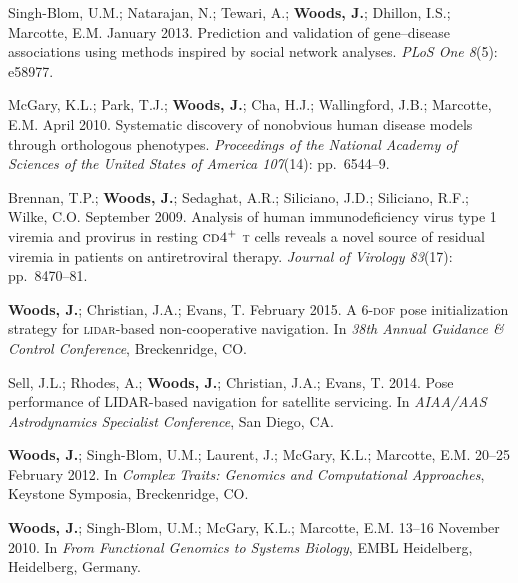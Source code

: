 \documentclass[12pt,letterpaper]{article}
\newcommand{\mhead}[1]{\leavevmode\marginpar{\sffamily\footnotesize #1}}
\begin{document}
\medskip
\par Singh-Blom, U.M.; Natarajan, N.; Tewari, A.; \textbf{Woods, J.}; Dhillon, I.S.; Marcotte, E.M. January 2013. Prediction and validation of gene--disease associations using methods inspired by social network analyses. \textit{PLoS One 8}(5): e58977.

\medskip
\par McGary, K.L.; Park, T.J.; \textbf{Woods, J.}; Cha, H.J.; Wallingford, J.B.; Marcotte, E.M. April 2010. Systematic discovery of nonobvious human disease models through orthologous phenotypes. \textit{Proceedings of the National Academy of Sciences of the United States of America 107}(14): pp.\ 6544--9.

\medskip
\par Brennan, T.P.; \textbf{Woods, J.}; Sedaghat, A.R.; Siliciano, J.D.; Siliciano, R.F.; Wilke, C.O. September 2009. Analysis of human immunodeficiency virus type 1 viremia and provirus in resting $\textsc{cd4}^{+}$ \textsc{t} cells reveals a novel source of residual viremia in patients on antiretroviral therapy. \textit{Journal of Virology 83}(17): pp.\ 8470--81.

\bigskip
\mhead{Conference \newline Proceedings}%
\par\vspace{-\baselineskip}\textbf{Woods, J.}; Christian, J.A.; Evans, T. February 2015. A \textsc{6-dof} pose initialization strategy for \textsc{lidar}-based non-cooperative navigation. In \textit{38th Annual Guidance \& Control Conference}, Breckenridge, CO.

\medskip
Sell, J.L.; Rhodes, A.; \textbf{Woods, J.}; Christian, J.A.; Evans, T. 2014. Pose performance of LIDAR-based navigation for satellite servicing. In \textit{AIAA/AAS Astrodynamics Specialist Conference}, San Diego, CA.

\bigskip
\mhead{Posters}%
\par\vspace{-\baselineskip}\textbf{Woods, J.}; Singh-Blom, U.M.; Laurent, J.; McGary, K.L.; Marcotte, E.M. 20--25 February 2012. In \textit{Complex Traits: Genomics and Computational Approaches}, Keystone Symposia, Breckenridge, CO.

\medskip
\par \textbf{Woods, J.}; Singh-Blom, U.M.; McGary, K.L.; Marcotte, E.M. 13--16 November 2010. In \textit{From Functional Genomics to Systems Biology},  EMBL Heidelberg, Heidelberg, Germany.
\end{document}
